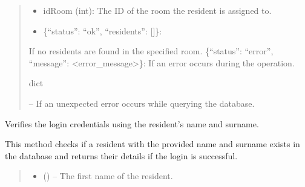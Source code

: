 \documentclass[letterpaper,10pt,english]{sphinxmanual}
\begin{document}
\begin{fulllineitems}
\begin{fulllineitems}
\begin{quote}
\begin{description}
\begin{description}
\begin{description}
\begin{itemize}
\item {} 
\sphinxAtStartPar
idRoom (int): The ID of the room the resident is assigned to.

\end{itemize}

\end{description}
\begin{itemize}
\item {} 
\sphinxAtStartPar
\{“status”: “ok”, “residents”: {[}{]}\}:

\end{itemize}

\sphinxAtStartPar
If no residents are found in the specified room.
\sphinxhyphen{} \{“status”: “error”, “message”: <error\_message>\}:
If an error occurs during the operation.

\end{description}


\sphinxAtStartPar
dict

\sphinxAtStartPar
{} – If an unexpected error occurs while querying the database.

\end{description}\end{quote}

\end{fulllineitems}


\begin{fulllineitems}
\label{\detokenize{app.controllers:app.controllers.resident_controller.ResidentController.login}}
\pysigstartsignatures
\pysiglinewithargsret
{}
{\sphinxparamcomma {}\sphinxparamcomma {}}
{}
\pysigstopsignatures
\sphinxAtStartPar
Verifies the login credentials using the resident’s name and surname.

\sphinxAtStartPar
This method checks if a resident with the provided name and surname exists
in the database and returns their details if the login is successful.
\begin{quote}\begin{description}
\begin{itemize}
\item {} 
\sphinxAtStartPar
{} () – The first name of the resident.


\end{itemize}
\end{description}
\end{quote}
\end{fulllineitems}
\end{fulllineitems}
\end{document}
